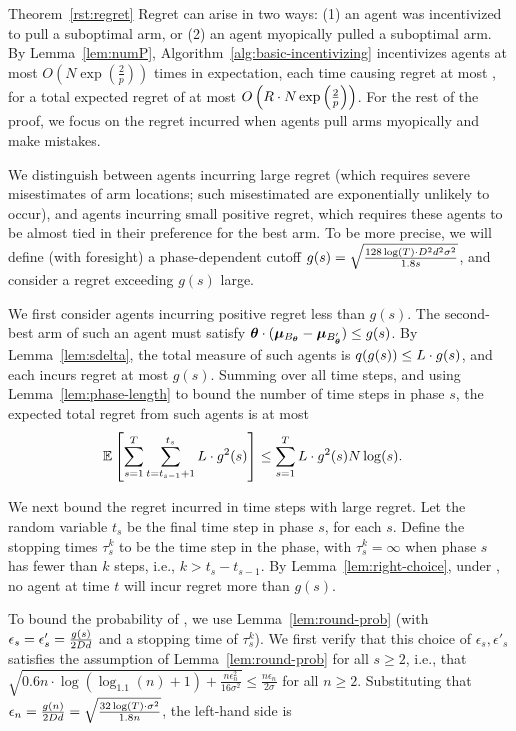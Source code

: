 \begin{extraproof}{Theorem~\ref{rst:regret}}
Regret can arise in two ways:
(1) an agent was incentivized to pull a suboptimal arm, or
(2) an agent myopically pulled a suboptimal arm.
By Lemma~\ref{lem:numP}, Algorithm~\ref{alg:basic-incentivizing}
incentivizes agents at most 
$O\left( N\exp\left(\frac{2}{p}\right) \right)$
times in expectation, each time causing regret at most \MAXR,
for a total expected regret of at most
$O\left(R\cdot N\exp\left(\frac{2}{p}\right) \right)$.
For the rest of the proof, we focus on the regret incurred when agents
pull arms myopically and make mistakes.

We distinguish between agents incurring large regret
(which requires severe misestimates of arm locations;
such misestimated are exponentially unlikely to occur), 
and agents incurring small positive regret,
which requires these agents to be almost tied in their preference for
the best arm.
To be more precise, we will define (with foresight) a phase-dependent
cutoff
$g(s) = \sqrt{\frac{128\log(T) \cdot D^2 d^2 \sigma^2}{1.8 s}}$,
and consider a regret exceeding $g(s)$ large.

We first consider agents \AgV incurring positive regret less than $g(s)$.
The second-best arm \Second{\AgV} of such an agent \AgV must satisfy
$\bm{\theta} \cdot (\bm{\mu}_{B_{\bm{\theta}}} - \bm{\mu}_{B'_{\bm{\theta}}}) \leq g(s)$.
By Lemma~\ref{lem:sdelta}, the total measure of such agents
is $q(g(s)) \leq L \cdot g(s)$,
and each incurs regret at most $g(s)$.
Summing over all time steps,
and using Lemma~\ref{lem:phase-length} to bound the number of time
steps in phase $s$, 
the expected total regret from such agents is at most
\begin{align}
\Expect{\sum_{s=1}^{T} \sum_{t=t_{s-1}+1}^{t_{s}} \TieDensity \cdot g^2(s)}
& \leq \sum_{s=1}^{T} \TieDensity \cdot g^2(s) \ARMNUM \log(s).
\label{equ:small_regret_bound}
\end{align}

We next bound the regret incurred in time steps with large regret.
Let the random variable $t_s$ be the final time step in phase $s$,
for each $s$. Define the stopping times $\tau_{s}^{k}$ to be the 
time step in the  phase,
with $\tau_{s}^{k} = \infty$ when phase $s$ has fewer than $k$ steps,
i.e., $k > t_{s}-t_{s-1}$.
By Lemma~\ref{lem:right-choice},
under , no agent at time $t$ will incur
regret more than $g(s)$.

To bound the probability of ,
we use Lemma~\ref{lem:round-prob}
(with $\epsilon_s = \epsilon'_s = \frac{g(s)}{2 D d}$
and a stopping time of $\tau_s^k$).
We first verify that this choice of $\epsilon_s, \epsilon'_s$
satisfies the assumption of Lemma~\ref{lem:round-prob} for all
$s \geq 2$,
i.e., that
$\sqrt{0.6 n \cdot \log (\log_{1.1}(n) + 1) + \frac{n \epsilon_n^2}{16 \sigma^2}}
\leq \frac{n \epsilon_n}{2 \sigma}$
for all $n \geq 2$.
Substituting that
$\epsilon_n = \frac{g(n)}{2 D d} = \sqrt{\frac{32\log(T) \cdot \sigma^2}{1.8 n}}$,
the left-hand side is


\end{extraproof}
